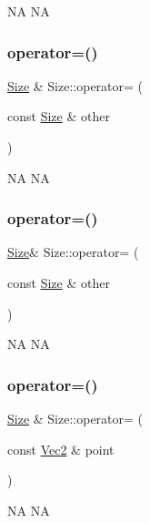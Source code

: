 NA  NA \mbox{\label{classSize_ad0e6ddb33be2355f860448748d66c04b}} 
\subsubsection{\texorpdfstring{operator=()}{operator=()}\hspace{0.1cm}{\footnotesize\ttfamily [1/4]}}
{\footnotesize\ttfamily \hyperlink{classSize}{Size} \& Size\+::operator= (\begin{DoxyParamCaption}\item[{const \hyperlink{classSize}{Size} \&}]{other }\end{DoxyParamCaption})}

NA  NA \mbox{\label{classSize_a27a0969f5f851a45da8ce08e14374d3f}} 
\subsubsection{\texorpdfstring{operator=()}{operator=()}\hspace{0.1cm}{\footnotesize\ttfamily [2/4]}}
{\footnotesize\ttfamily \hyperlink{classSize}{Size}\& Size\+::operator= (\begin{DoxyParamCaption}\item[{const \hyperlink{classSize}{Size} \&}]{other }\end{DoxyParamCaption})}

NA  NA \mbox{\label{classSize_a56ca561ea815bad82fceecc659f1e399}} 
\subsubsection{\texorpdfstring{operator=()}{operator=()}\hspace{0.1cm}{\footnotesize\ttfamily [3/4]}}
{\footnotesize\ttfamily \hyperlink{classSize}{Size} \& Size\+::operator= (\begin{DoxyParamCaption}\item[{const \hyperlink{classVec2}{Vec2} \&}]{point }\end{DoxyParamCaption})}

NA  NA \mbox{\label{classSize_aaf32198481cd7255dd15f57da766da86}} 
